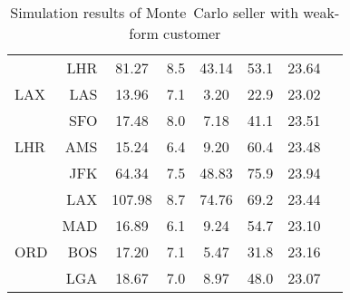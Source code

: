 \begin{table}[h]
\begin{center}
\begin{tabular}{l r c c c c c c}
     &  LHR &  81.27  &    8.5  &  43.14  &   53.1  &  23.64  \\[.5ex]
LAX  &  LAS &  13.96  &    7.1  &   3.20  &   22.9  &  23.02  \\
     &  SFO &  17.48  &    8.0  &   7.18  &   41.1  &  23.51  \\[.5ex]
LHR  &  AMS &  15.24  &    6.4  &   9.20  &   60.4  &  23.48  \\
     &  JFK &  64.34  &    7.5  &  48.83  &   75.9  &  23.94  \\
     &  LAX &  107.98  &    8.7  &  74.76  &   69.2  &  23.44  \\
     &  MAD &  16.89  &    6.1  &   9.24  &   54.7  &  23.10  \\[.5ex]
ORD  &  BOS &  17.20  &    7.1  &   5.47  &   31.8  &  23.16  \\
     &  LGA &  18.67  &    7.0  &   8.97  &   48.0  &  23.07  \\
           \bottomrule
        \end{tabular}
        \caption{Simulation results of Monte~Carlo seller with weak-form customer}
        \label{tbl:resultsStrongWeak}
    \end{center}
\end{table}
